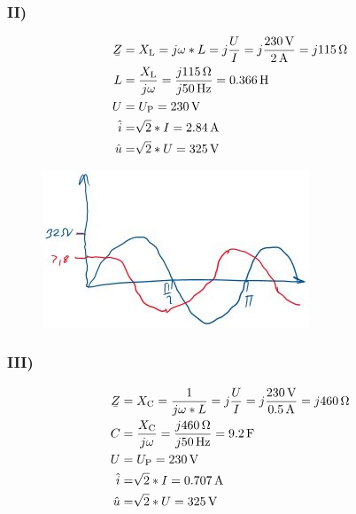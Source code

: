 \documentclass[../../document.tex]{subfiles}
\begin{document}
\subsubsection*{II)}

\begin{equation*}
    \begin{split}
        \ubar{Z} &= X\cind{L} = j \omega * L = j \frac{U}{I} = j \frac{\SI{230}{\volt}}{\SI{2}{\ampere}} = j \SI{115}{\ohm}\\
        L &= \frac{X\cind{L}}{j\omega} = \frac{j \SI{115}{\ohm}}{j \SI{50}{\hertz}} = \SI{0,366}{\henry}\\
        U &= U\cind{P} = \SI{230}{\volt}\\
        \hat{i} &= \sqrt[]{2} * I = \SI{2,84}{\ampere}\\
        \hat{u} &= \sqrt[]{2} * U = \SI{325}{\volt}\\
    \end{split}
\end{equation*}

\begin{figure}[H]
    \begin{center}
        \includegraphics[width=.9\linewidth]{../../img/task1-a-ii.jpeg}
    \end{center}
\end{figure}

\subsubsection*{III)}

\begin{equation*}
    \begin{split}
        \ubar{Z} &= X\cind{C} = \frac{1}{j \omega * L} = j \frac{U}{I} = j \frac{\SI{230}{\volt}}{\SI{0,5}{\ampere}} = j \SI{460}{\ohm}\\
        C &= \frac{X\cind{C}}{j\omega} = \frac{j \SI{460}{\ohm}}{j \SI{50}{\hertz}} = \SI{9,2}{\farad}\\
        U &= U\cind{P} = \SI{230}{\volt}\\
        \hat{i} &= \sqrt[]{2} * I = \SI{0,707}{\ampere}\\
        \hat{u} &= \sqrt[]{2} * U = \SI{325}{\volt}\\
    \end{split}
\end{equation*}
\end{document}
